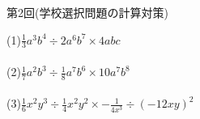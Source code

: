 \documentclass{jarticle}
\begin{document}
\begin{center}
第2回(学校選択問題の計算対策)
\end{center}
(1)$\frac{1}{3}a^{3}b^{4}÷2a^{6}b^{7}×4abc$\\
\\
(2)$\frac{1}{7}a^{2}b^{3}÷\frac{1}{8}a^{7}b^{6}×10a^{7}b^{8}$\\
\\
(3)$\frac{1}{6}x^{2}y^{3}÷\frac{1}{4}x^{2}y^{2}×-\frac{1}{4x^{3}}÷(-12xy)^{2}$\\
\\
\end{document}
